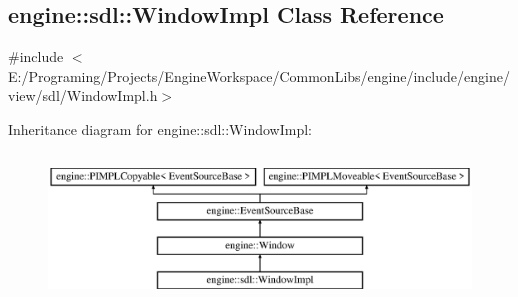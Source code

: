 \hypertarget{a00085}{}\subsection{engine\+:\+:sdl\+:\+:Window\+Impl Class Reference}
\label{a00085}


{\ttfamily \#include $<$E\+:/\+Programing/\+Projects/\+Engine\+Workspace/\+Common\+Libs/engine/include/engine/view/sdl/\+Window\+Impl.\+h$>$}

Inheritance diagram for engine\+:\+:sdl\+:\+:Window\+Impl\+:\begin{figure}[H]
\begin{center}
\leavevmode
\includegraphics[height=3.971631cm]{a00085}
\end{center}
\end{figure}
